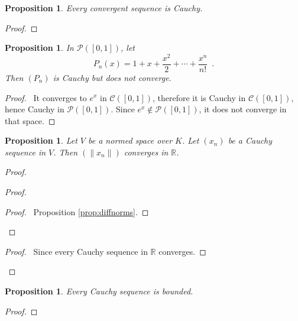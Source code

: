 \documentclass{book}
\let\qed\relax
\newtheorem{prop}[ax]{Proposition}
\theoremstyle{definition}
\begin{document}
\begin{prop}
Every convergent sequence is Cauchy.
\end{prop}

\begin{proof}
\pf
{}
\qed
\end{proof}

\begin{prop}
\label{prop:P01example}
In $\mathcal{P}([0,1])$, let
\[ P_n(x) = 1 + x + \frac{x^2}{2} + \cdots + \frac{x^n}{n!} \enspace . \]
Then $(P_n)$ is Cauchy but does not converge.
\end{prop}

\begin{proof}
\pf\ It converges to $e^x$ in $\mathcal{C}([0,1])$, therefore it is Cauchy in $\mathcal{C}([0,1])$, hence Cauchy in $\mathcal{P}([0,1])$. Since $e^x \notin \mathcal{P}([0,1])$, it does not converge in that space. \qed
\end{proof}

\begin{prop}
Let $V$ be a normed space over $K$. Let $(x_n)$ be a Cauchy sequence in $V$. Then $(\|x_n\|)$ converges in $\mathbb{R}$.
\end{prop}

\begin{proof}
\pf
{}
\begin{proof}
	\begin{proof}
		\pf\ Proposition \ref{prop:diffnorms}.
	\end{proof}
\end{proof}
\qedstep
\begin{proof}
	\pf\ Since every Cauchy sequence in $\mathbb{R}$ converges.
\end{proof}
\qed
\end{proof}

\begin{prop}
Every Cauchy sequence is bounded.
\end{prop}

\begin{proof}
\pf
{}
\qed
\end{proof}
\end{document}
